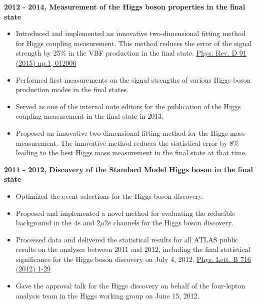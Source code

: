 \noindent\textbf{2012 - 2014, Measurement of the Higgs boson properties in the \llll final state}
\begin{itemize}
    \item Introduced and implemented an innovative two-dimensional fitting method for 
        Higgs coupling measurement. This method reduces the error of the signal 
        strength by 25\% in the VBF production in the \llll final state.
        \href{https://journals.aps.org/prd/abstract/10.1103/PhysRevD.91.012006}{Phys. Rev. D 91 (2015) np.1, 012006}
    \item Performed first measurements on the signal strengths of 
        various Higgs boson production modes in the \llll final states.
        
    \item Served as one of the internal note editors for the publication 
        of the Higgs coupling measurement in the \llll final state in 2013.
    \item Proposed an innovative two-dimensional fitting method for the Higgs mass measurement. 
        The innovative method reduces the statistical error by 8\% leading to the best Higgs mass measurement 
        in the \llll final state at that time.
\end{itemize}

\noindent\textbf{2011 - 2012, Discovery of the Standard Model Higgs boson in the \llll final state}
\begin{itemize}
    \item Optimized the \llll event selections for the Higgs boson discovery.
    \item Proposed and implemented a novel method for evaluating the reducible background in the $4e$ and 
        $2\mu2e$ channels for the Higgs boson discovery.
    \item Processed data and delivered the statistical results for all ATLAS public 
        results on the \llll analyses between 2011 and 2012, including the final statistical 
        significance for the Higgs boson discovery on July 4, 2012.
        \href{http://www.sciencedirect.com/science/article/pii/S037026931200857X}{Phys. Lett. B 716 (2012) 1-29}
    \item Gave the approval talk for the Higgs discovery on behalf of the four-lepton analysis team 
        in the Higgs working group on June 15, 2012.
\end{itemize}

